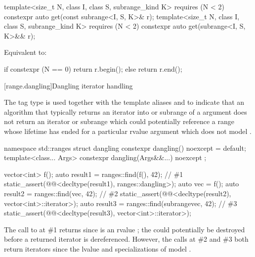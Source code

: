 %
\begin{itemdecl}
template<size_t N, class I, class S, subrange_kind K>
  requires (N < 2)
  constexpr auto get(const subrange<I, S, K>& r);
template<size_t N, class I, class S, subrange_kind K>
  requires (N < 2)
  constexpr auto get(subrange<I, S, K>&& r);
\end{itemdecl}

\begin{itemdescr}
\pnum
\effects
Equivalent to:
\begin{codeblock}
if constexpr (N == 0)
  return r.begin();
else
  return r.end();
\end{codeblock}
\end{itemdescr}

[range.dangling]{Dangling iterator handling}

\pnum
The tag type  is used together
with the template aliases  and 
to indicate that an algorithm
that typically returns an iterator into or subrange of a  argument
does not return an iterator or subrange
which could potentially reference a range
whose lifetime has ended for a particular rvalue  argument
which does not model .
%
\begin{codeblock}
namespace std::ranges {
  struct dangling {
    constexpr dangling() noexcept = default;
    template<class... Args>
      constexpr dangling(Args&&...) noexcept { }
  };
}
\end{codeblock}

\pnum
\begin{example}
\begin{codeblock}
vector<int> f();
auto result1 = ranges::find(f(), 42);                                   // \#1
static_assert(@@<decltype(result1), ranges::dangling>);
auto vec = f();
auto result2 = ranges::find(vec, 42);                                   // \#2
static_assert(@@<decltype(result2), vector<int>::iterator>);
auto result3 = ranges::find(subrange{vec}, 42);                         // \#3
static_assert(@@<decltype(result3), vector<int>::iterator>);
\end{codeblock}
The call to  at \#1 returns 
since  is an rvalue ;
the  could potentially be destroyed
before a returned iterator is dereferenced.
However, the calls at \#2 and \#3 both return iterators
since the lvalue  and specializations of 
model .
\end{example}

